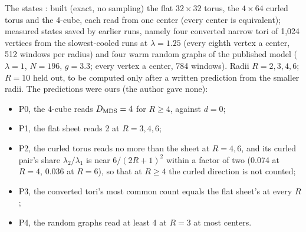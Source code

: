 \documentclass[aps,pre,10pt,twocolumn,superscriptaddress,nofootinbib]{revtex4-2}
\begin{document}
The states \cite{prereg}: built (exact, no sampling) the flat $32\times32$ torus, the $4\times64$ curled torus and the
4-cube, each read from one center (every center is equivalent); measured states saved by earlier runs, namely four
converted narrow tori of 1,024 vertices from the slowest-cooled runs at $\lambda=1.25$ (every eighth vertex a center,
512 windows per radius) and four warm random graphs of the published model ($\lambda=1$, $N=196$, $g=3.3$; every vertex
a center, 784 windows). Radii $R=2,3,4,6$; $R=10$ held out, to be computed only after a written prediction from the
smaller radii. The predictions were ours (the author gave none):
\begin{itemize}
\item P0, the 4-cube reads $D_{\rm MDS}=4$ for $R\ge4$, against $d=0$;
\item P1, the flat sheet reads 2 at $R=3,4,6$;
\item P2, the curled torus reads no more than the sheet at $R=4,6$, and its curled pair's share
$\lambda_2/\lambda_1$ is near $6/(2R+1)^2$ within a factor of two (0.074 at $R=4$, 0.036 at $R=6$), so that at
$R\ge4$ the curled direction is not counted;
\item P3, the converted tori's most common count equals the flat sheet's at every $R$;
\item P4, the random graphs read at least 4 at $R=3$ at most centers.
\end{itemize}
\end{document}
